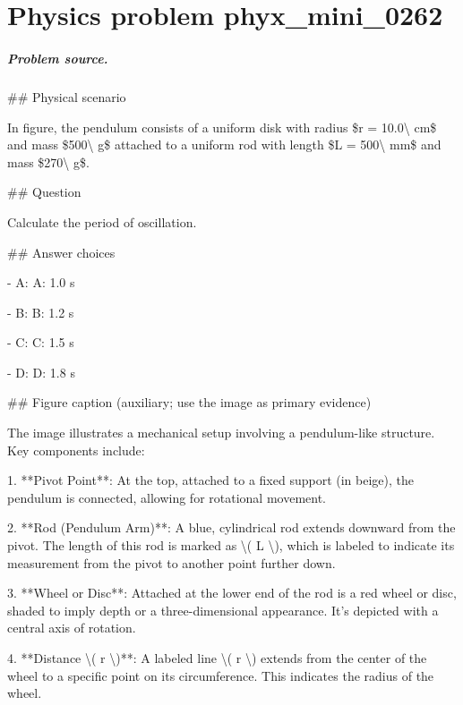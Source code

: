
\chapter{Physics problem phyx\_mini\_0262}
\label{ch:PhyXMiniProblems_problem_phyx_mini_0262}

\paragraph{Problem source.}
\#\# Physical scenario

In figure, the pendulum consists of a uniform disk with radius \$r = 10.0\textbackslash{} cm\$ and mass \$500\textbackslash{} g\$ attached to a uniform rod with length \$L = 500\textbackslash{} mm\$ and mass \$270\textbackslash{} g\$.

\#\# Question

Calculate the period of oscillation.

\#\# Answer choices

- A: A: 1.0 s

- B: B: 1.2 s

- C: C: 1.5 s

- D: D: 1.8 s

\#\# Figure caption (auxiliary; use the image as primary evidence)

The image illustrates a mechanical setup involving a pendulum-like structure. Key components include:

1. **Pivot Point**: At the top, attached to a fixed support (in beige), the pendulum is connected, allowing for rotational movement.

2. **Rod (Pendulum Arm)**: A blue, cylindrical rod extends downward from the pivot. The length of this rod is marked as \textbackslash{}( L \textbackslash{}), which is labeled to indicate its measurement from the pivot to another point further down.

3. **Wheel or Disc**: Attached at the lower end of the rod is a red wheel or disc, shaded to imply depth or a three-dimensional appearance. It's depicted with a central axis of rotation.

4. **Distance \textbackslash{}( r \textbackslash{})**: A labeled line \textbackslash{}( r \textbackslash{}) extends from the center of the wheel to a specific point on its circumference. This indicates the radius of the wheel.

